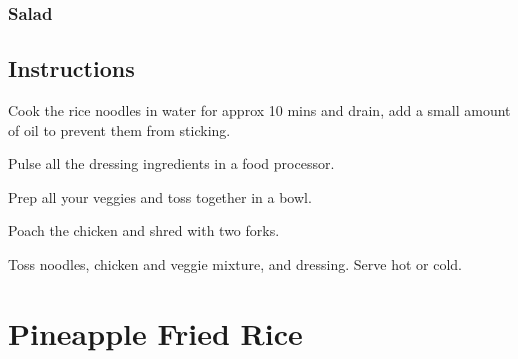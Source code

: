 \documentclass[ansiapaper,10pt,english]{sphinxmanual}
\begin{document}
\subsection{Salad}
\label{\detokenize{thai_salad_peanutlime:salad}}
%
\begin{sphinxVerbatim}[commandchars=\\\{\}]
      

     

     

       

       

     

      

    
\end{sphinxVerbatim}


\section{Instructions}
\label{\detokenize{thai_salad_peanutlime:instructions}}
Cook the rice noodles in water for approx 10 mins and drain, add a small amount of oil to prevent them from sticking.

Pulse all the dressing ingredients in a food processor.

Prep all your veggies and toss together in a bowl.

Poach the chicken and shred with two forks.

Toss noodles, chicken and veggie mixture, and dressing. Serve hot or cold.


\chapter{Pineapple Fried Rice}
\label{\detokenize{PFR:pineapple-fried-rice}}\label{\detokenize{PFR::doc}}
\end{document}
